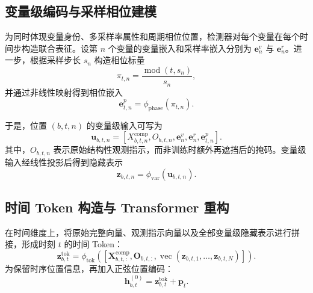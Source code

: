 \documentclass[bachelor, vlined]{DissertUESTC}
\begin{document}
    \subsection{变量级编码与采样相位建模}

    为同时体现变量身份、多采样率属性和周期相位位置，检测器对每个变量在每个时间步构造联合表征。设第 $n$ 个变量的变量嵌入和采样率嵌入分别为 $\mathbf{e}_n^{v}$ 与 $\mathbf{e}_n^{r}$。进一步，根据采样步长 $s_n$ 构造相位标量
    \begin{equation}
        \pi_{t,n} = \frac{\operatorname{mod}(t,s_n)}{s_n},
    \end{equation}
    并通过非线性映射得到相位嵌入
    \begin{equation}
        \mathbf{e}_{t,n}^{p} = \phi_{\mathrm{phase}}(\pi_{t,n}).
    \end{equation}

    于是，位置 $(b,t,n)$ 的变量级输入可写为
    \begin{equation}
        \mathbf{u}_{b,t,n}
        =
        \left[
            X_{b,t,n}^{\mathrm{comp}},
            O_{b,t,n},
            \mathbf{e}_n^{v},
            \mathbf{e}_n^{r},
            \mathbf{e}_{t,n}^{p}
        \right].
    \end{equation}
    其中，$O_{b,t,n}$ 表示原始结构性观测指示，而非训练时额外再遮挡后的掩码。变量级输入经线性投影后得到隐藏表示
    \begin{equation}
        \mathbf{z}_{b,t,n} = \phi_{\mathrm{var}}(\mathbf{u}_{b,t,n}).
    \end{equation}

    \subsection{时间 Token 构造与 Transformer 重构}

    在时间维度上，将原始完整向量、观测指示向量以及全部变量级隐藏表示进行拼接，形成时刻 $t$ 的时间 Token：
    \begin{equation}
        \mathbf{z}_{b,t}^{\mathrm{tok}}
        =
        \phi_{\mathrm{tok}}
        \left(
            \left[
                \mathbf{X}_{b,t,:}^{\mathrm{comp}},
                \mathbf{O}_{b,t,:},
                \operatorname{vec}(\mathbf{z}_{b,t,1},\ldots,\mathbf{z}_{b,t,N})
            \right]
        \right).
    \end{equation}
    为保留时序位置信息，再加入正弦位置编码：
    \begin{equation}
        \mathbf{h}_{b,t}^{(0)} = \mathbf{z}_{b,t}^{\mathrm{tok}} + \mathbf{p}_t.
    \end{equation}
\end{document}
